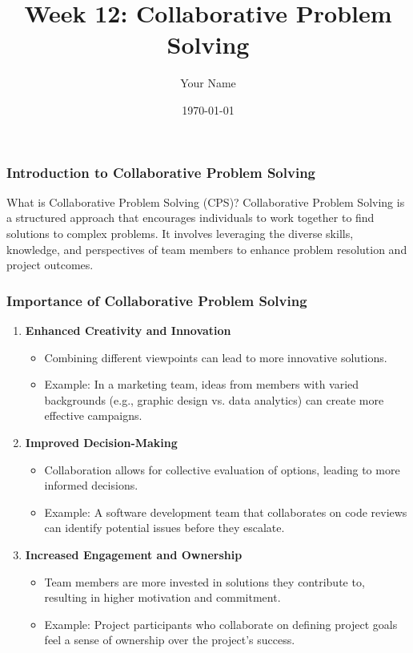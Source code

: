 \documentclass{beamer}
\title{Week 12: Collaborative Problem Solving}
\author{Your Name}
\institute{Your Institution}
\date{\today}
\begin{document}
\frame{\titlepage}

\begin{frame}[fragile]
    \frametitle{Introduction to Collaborative Problem Solving}
    \begin{block}{What is Collaborative Problem Solving (CPS)?}
        Collaborative Problem Solving is a structured approach that encourages individuals to work together to find solutions to complex problems. It involves leveraging the diverse skills, knowledge, and perspectives of team members to enhance problem resolution and project outcomes.
    \end{block}
\end{frame}

\begin{frame}[fragile]
    \frametitle{Importance of Collaborative Problem Solving}
    \begin{enumerate}
        \item \textbf{Enhanced Creativity and Innovation}
            \begin{itemize}
                \item Combining different viewpoints can lead to more innovative solutions.
                \item Example: In a marketing team, ideas from members with varied backgrounds (e.g., graphic design vs. data analytics) can create more effective campaigns.
            \end{itemize}
        \item \textbf{Improved Decision-Making}
            \begin{itemize}
                \item Collaboration allows for collective evaluation of options, leading to more informed decisions.
                \item Example: A software development team that collaborates on code reviews can identify potential issues before they escalate.
            \end{itemize}
        \item \textbf{Increased Engagement and Ownership}
            \begin{itemize}
                \item Team members are more invested in solutions they contribute to, resulting in higher motivation and commitment.
                \item Example: Project participants who collaborate on defining project goals feel a sense of ownership over the project's success.
            \end{itemize}
    \end{enumerate}
\end{frame}
\end{document}
